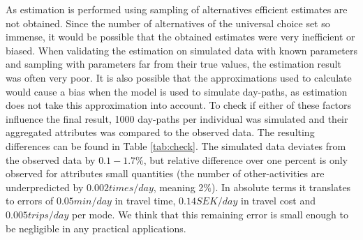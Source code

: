 
As estimation is performed using sampling of alternatives efficient estimates are not obtained. Since the number of alternatives of the universal choice set so immense, it would be possible that the obtained estimates were very inefficient or biased. When validating the estimation on simulated data with known parameters and sampling with parameters far from their true values, the estimation result was often very poor. It is also possible that the approximations used to calculate \aeutil would cause a bias when the model is used to simulate day-paths, as estimation does not take this approximation into account. To check if either of these factors influence the final result, 1000 day-paths per individual was simulated and their aggregated attributes was compared to the observed data. The resulting differences can be found in Table \ref{tab:check}. The simulated data deviates from the observed data by $0.1-1.7\%$, but relative difference over one percent is only observed for attributes small quantities (the number of other-activities are underpredicted by $0.002\unit{times/day}$, meaning 2$\%$). In absolute terms it translates to errors of $0.05\unit{min/day}$ in travel time, $0.14\unit{SEK/day}$ in travel cost and $0.005\unit{trips/day}$ per mode. We think that this remaining error is small enough to be negligible in any practical applications. 


